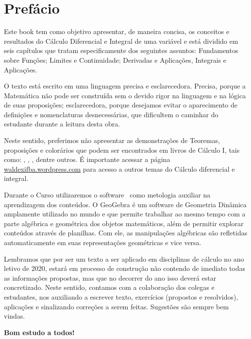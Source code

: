 \cleardoublepage
\chapter*{Prefácio}

Este book tem como objetivo apresentar, de maneira concisa, os conceitos e resultados do
Cálculo Diferencial e Integral de uma variável e está dividido em seis capítulos que tratam especificamente dos seguintes assuntos: Fundamentos sobre Funções; Limites e Continuidade; Derivadas e Aplicações, Integrais e Aplicações.

O texto está escrito em uma linguagem precisa e esclarecedora. Precisa, porque a Matemática não
pode ser construída sem o devido rigor na linguagem e na lógica de suas proposições; esclarecedora, porque desejamos evitar o aparecimento de definições e nomenclaturas desnecessárias, que dificultem o caminhar do estudante durante a leitura desta obra.

Neste sentido, preferimos não apresentar as demonstrações de  Teoremas, proposições e colorários que podem ser encontrados em livros de Cálculo I, tais como: , , , dentre outros. É importante acessar a página \href{waldexifba.wordpress.com}{waldexifba.wordpress.com} para acesso a outros temas do Cálculo diferencial e integral.

Durante o Curso utilizaremos o software \geogebra~como metologia auxiliar na aprendizagem dos conteúdos. O GeoGebra é um software de Geometria Dinâmica amplamente utilizado no mundo e que permite trabalhar ao mesmo tempo com a parte algébrica e geométrica dos objetos matemáticos, além de permitir explorar conteúdos através de planilhas. Com ele, as manipulações algébricas são refletidas automaticamente em suas representações geométricas e vice versa.

Lembramos que por ser um texto a ser aplicado em disciplinas de cálculo no ano letivo de 2020, estará  em processo de construção não contendo de imediato todas as informações propostas, mas que no decorrer do ano isso deverá estar concretizado. Neste sentido, contamos com a colaboração dos colegas e estudantes, nos auxiliando a escrever texto, exercícios (propostos e resolvidos), aplicações e sinalizando correções a serem feitas. Sugestões são sempre bem vindas.

\textbf{Bom estudo a todos!}
